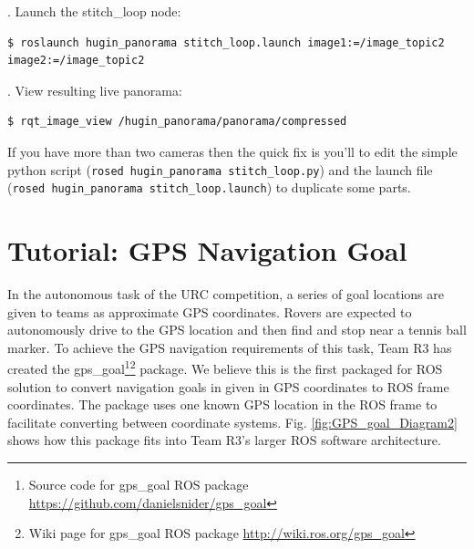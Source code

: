 \documentclass[runningheads,a4paper]{llncs}
\begin{document}
. Launch the stitch\_loop node:

\begin{lstlisting}[frame=single,basicstyle=\ttfamily\footnotesize,breaklines=true]
$ roslaunch hugin_panorama stitch_loop.launch image1:=/image_topic2 image2:=/image_topic2
\end{lstlisting}

. View resulting live panorama:

\begin{lstlisting}[frame=single,basicstyle=\ttfamily\footnotesize,breaklines=true]
$ rqt_image_view /hugin_panorama/panorama/compressed
\end{lstlisting}

If you have more than two cameras then the quick fix is you'll to edit the simple python script (\texttt{rosed hugin\_panorama stitch\_loop.py}) and the launch file (\texttt{rosed hugin\_panorama stitch\_loop.launch}) to duplicate some parts.


\section{Tutorial: GPS Navigation Goal}\label{gpsnav}

In the autonomous task of the URC competition, a series of goal locations are given to teams as approximate GPS coordinates. Rovers are expected to autonomously drive to the GPS location and then find and stop near a tennis ball marker. To achieve the GPS navigation requirements of this task, Team R3 has created the gps\_goal\footnote{Source code for gps\_goal ROS package \url{https://github.com/danielsnider/gps_goal}}\footnote{Wiki page for gps\_goal ROS package \url{http://wiki.ros.org/gps_goal}} package. We believe this is the first packaged for ROS solution to convert navigation goals in given in GPS coordinates to ROS frame coordinates. The package uses one known GPS location in the ROS frame to facilitate converting between coordinate systems. Fig. \ref{fig:GPS_goal_Diagram2} shows how this package fits into Team R3's larger ROS software architecture.
\end{document}
